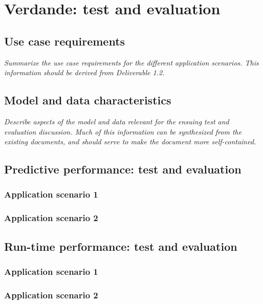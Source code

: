 \documentclass[11pt, oneside]{article}   	%
\numberwithin{figure}{section}
\numberwithin{equation}{section}
\numberwithin{table}{section}
\begin{document}
\section{Verdande: test and evaluation}

\subsection{Use case requirements}

\emph{Summarize the use case requirements for the different application scenarios. This information should be
  derived from Deliverable 1.2.}

\subsection{Model and data characteristics}

\emph{Describe aspects of the model and data relevant for the ensuing test and evaluation discussion. Much of
  this information can be synthesized from the existing documents, and should serve to make the document more
  self-contained. }




\subsection{Predictive performance: test and evaluation}

\subsubsection{Application scenario 1}

\subsubsection{Application scenario 2}

\subsection{Run-time performance: test and evaluation}

\subsubsection{Application scenario 1}

\subsubsection{Application scenario 2}







\end{document}
